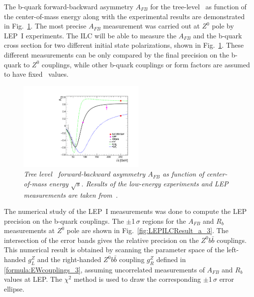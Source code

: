 The b-quark forward-backward asymmetry $A_{FB}$ for the tree-level \sm\ as function of the center-of-mass energy along with the experimental results are demonstrated in Fig.~\ref{fig:LEPILC_3}. 
The most precise $A_{FB}$ measurement was carried out at $Z^0$ pole by LEP~I experiments. 
The ILC will be able to measure the $A_{FB}$ and the b-quark cross section for two different initial state polarizations, shown in  Fig.~\ref{fig:LEPILC_3}. 
These different measurements can be only compared by the final precision on the b-quark to $Z^0$ couplings, while other b-quark couplings or form factors are assumed to have fixed \sm\ values. 
\begin{figure}
	{\centering
		\includegraphics[width=0.55\textwidth]{ILD/plots/afb-sqrts.pdf}
		\caption{\sl Tree level \sm\ forward-backward asymmetry $A_{FB}$ as function of center-of-mass energy $\sqrt{s}$.  Results of the low-energy experiments and LEP measurements are taken from~\cite{bib:LEPpuzzle}. 
		}
		\label{fig:LEPILC_3}
	}
	
\end{figure}
The numerical study of the LEP~I measurements was done to compute the LEP precision on the b-quark couplings. 
The $\pm$1\,$\sigma$ regions for the $A_{FB}$ and $R_b$ measurements at $Z^0$ pole are shown in Fig.~\ref{fig:LEPILCResult_a_3}.
The intersection of the error bands gives the relative precision on the $Z^0 b\bar{b}$ couplings.
This numerical result is obtained by scanning the parameter space of the left-handed $g^Z_L$ and the right-handed $Z^0b\bar{b}$ coupling $g^Z_R$ defined in \ref{formula:EWcouplings_3}, assuming uncorrelated measurements of $A_{FB}$ and $R_b$ values at LEP. 
The $\chi^2$ method is used to draw the corresponding $\pm$1\,$\sigma$ error ellipse.
